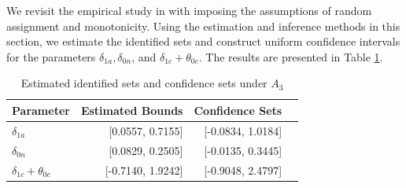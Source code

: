 \documentclass[12pt]{article}
\theoremstyle{plain}
\theoremstyle{definition}
\theoremstyle{remark}
\begin{document}
We revisit the empirical study in \cite{bursztyn2020misperceived} with imposing the assumptions of random assignment and monotonicity. Using the estimation and inference methods in this section, we estimate the identified sets and construct uniform confidence intervals for the parameters $\delta_{1a}, \delta_{0n}$, and $\delta_{1c} + \theta_{0c}$. The results are presented in Table \ref{tab:inf_bounds_no_er}.
\begin{table}
    \centering
    \caption{Estimated identified sets and confidence sets under $A_3$}
      \begin{tabular}{lrrr}
      \toprule
        Parameter    & \multicolumn{1}{c}{Estimated Bounds}  & \multicolumn{1}{c}{Confidence Sets} \\
      \midrule
      $\delta_{1a}$ \quad \quad \quad \quad & [0.0557, 0.7155] \quad \quad \quad \quad &[-0.0834, 1.0184] \\
      $\delta_{0n}$ \quad \quad \quad \quad & [0.0829, 0.2505] \quad \quad \quad \quad & [-0.0135, 0.3445] \\
      $\delta_{1c}+\theta_{0c}$ \quad \quad \quad \quad& [-0.7140, 1.9242] \quad \quad \quad \quad & [-0.9048, 2.4797] \\
      \bottomrule
      \end{tabular}%
    \label{tab:inf_bounds_no_er}%
\end{table}%
\end{document}
